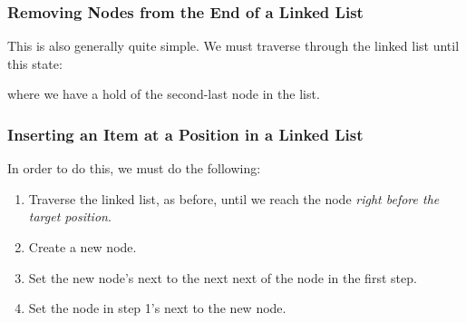 \documentclass[./main.tex]{subfiles}
\begin{document}
\subsubsection{Removing Nodes from the End of a Linked List}

This is also generally quite simple. We must traverse through the linked list until this state:

\begin{figure}[htbp]
    \centering
\end{figure}

where we have a hold of the second-last node in the list. 

\subsubsection{Inserting an Item at a Position in a Linked List}

In order to do this, we must do the following:

\begin{enumerate}
    \item Traverse the linked list, as before, until we reach the node \emph{right before the target position}.
    \item Create a new node.
    \item Set the new node's {\mono next} to the {\mono next} next of the node in the first step. 
    \item Set the node in step 1's {\mono next} to the new node. 
\end{enumerate}
\end{document}
